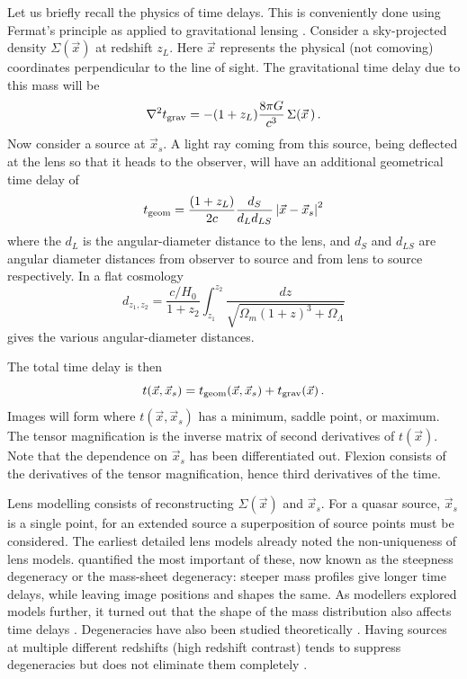 \documentclass[
  11pt,
  twoside,
  openright,
  titlepage,
  headings=optiontoheadandtoc
]{scrbook}
\begin{document}
Let us briefly recall the physics of time delays.  This is
conveniently done using Fermat's principle as applied to gravitational
lensing \citep{1986ApJ...310..568B}.  Consider a sky-projected density
$\Sigma(\vec x)$ at redshift $z_L$.  Here $\vec x$ represents the physical
(not comoving) coordinates perpendicular to the line of sight.  The
gravitational time delay due to this mass will be
\begin{equation}
\nabla^2 t_{\rm grav} = -(1+z_L)\frac{8\pi G}{c^3} \, \Sigma(\vec x\,) \,.
\end{equation}
Now consider a source at $\vec x_s$.  A light ray coming from this
source, being deflected at the lens so that it heads to the observer,
will have an additional geometrical time delay of
\begin{equation}
t_{\rm geom} = \frac{(1+z_L)}{2c} \frac{d_S}{d_L d_{LS}}
               \left| \vec x - \vec x_s\right|^2
\end{equation}
where the $d_L$ is the angular-diameter distance to the lens, and $d_S$
and $d_{LS}$ are angular diameter distances from observer to source
and from lens to source respectively.  In a flat cosmology
\begin{equation}
d_{z_1,z_2} = \frac{c/H_0}{1+z_2}\int_{z_1}^{z_2}
              \frac{dz}{\sqrt{\Omega_m(1+z)^3 + \Omega_\Lambda}}
\end{equation}
gives the various angular-diameter distances.

The total time delay is then
\begin{equation}
t(\vec x, \vec x_s) = t_{\rm geom}(\vec x,\vec x_s) + t_{\rm grav}(\vec x) \,.
\end{equation}
Images will form where $t(\vec x, \vec x_s)$ has a minimum, saddle
point, or maximum.  The tensor magnification is the inverse matrix of
second derivatives of $t(\vec x)$.  Note that the dependence on $\vec
x_s$ has been differentiated out.  Flexion consists of the derivatives
of the tensor magnification, hence third derivatives of the time.

Lens modelling consists of reconstructing $\Sigma(\vec x)$ and $\vec
x_s$.  For a quasar source, $\vec x_s$ is a single point, for an extended
source a superposition of source points must be considered.
The earliest detailed lens models \citep{1981ApJ...244..736Y} already
noted the non-uniqueness of lens models. \cite{1985ApJ...289L...1F}
quantified the most important of these, now known as the steepness
degeneracy or the mass-sheet degeneracy: steeper mass profiles give
longer time delays, while leaving image positions and shapes the
same. As modellers explored models further, it turned out that the
shape of the mass distribution also affects time delays
\citep{1997MNRAS.292..148S,2003ApJ...582....2Z,2006ApJ...653..936S}.
Degeneracies have also been studied theoretically \citep{2013A&A...559A..37S}.
Having sources at multiple different redshifts (high redshift
contrast) tends to suppress degeneracies
\citep{1998AJ....116.1541A,2009ApJ...690..154S} but does not eliminate
them completely \citep{2008MNRAS.386..307L,2012MNRAS.425.1772L}.
\end{document}
